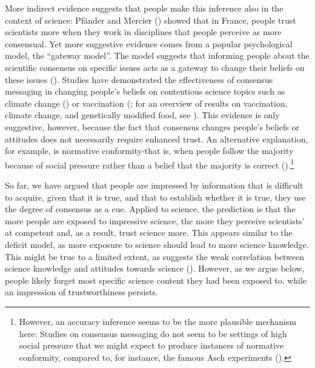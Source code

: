 \documentclass[
  jou,
  floatsintext,
  longtable,
  nolmodern,
  notxfonts,
  notimes,
  colorlinks=true,linkcolor=blue,citecolor=blue,urlcolor=blue]{apa7}
\begin{document}
More indirect evidence suggests that people make this inference also in
the context of science: Pfänder and Mercier
() showed that in France,
people trust scientists more when they work in disciplines that people
perceive as more consensual. Yet more suggestive evidence comes from a
popular psychological model, the ``gateway model''. The model suggests
that informing people about the scientific consensus on specific issues
acts as a gateway to change their beliefs on these issues
().
Studies have demonstrated the effectiveness of consensus messaging in
changing people's beliefs on contentious science topics such as climate
change () or vaccination
(;
for an overview of results on vaccination, climate change, and
genetically modified food, see
). This evidence is only suggestive, however,
because the fact that consensus changes people's beliefs or attitudes
does not necessarily require enhanced trust. An alternative explanation,
for example, is normative conformity-that is, when people follow the
majority because of social pressure rather than a belief that the
majority is correct ().\footnote{However, an accuracy inference seems to be
  the more plausible mechanism here: Studies on consensus messaging do
  not seem to be settings of high social pressure that we might expect
  to produce instances of normative conformity, compared to, for
  instance, the famous Asch experiments
  ().}

So far, we have argued that people are impressed by information that is
difficult to acquire, given that it is true, and that to establish
whether it is true, they use the degree of consensus as a cue. Applied
to science, the prediction is that the more people are exposed to
impressive science, the more they perceive scientists' at competent and,
as a result, trust science more. This appears similar to the deficit
model, as more exposure to science should lead to more science
knowledge. This might be true to a limited extent, as suggests the weak
correlation between science knowledge and attitudes towards science
().
However, as we argue below, people likely forget most specific science
content they had been exposed to, while an impression of trustworthiness
persists.
\end{document}
